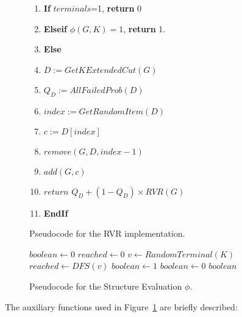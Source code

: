 \begin{figure}
\begin{algorithm}[H]
\caption{$RVR(G,K,p_v,p_e)$}
\begin{enumerate}
\item \textbf{If} $terminals$=1, \textbf{return} $0$
\item \textbf{Elseif} $\phi(G,K)=1$, \textbf{return} 1.
\item \textbf{Else} 
\item $D := GetKExtendedCut(G)$
\item $Q_{D} := AllFailedProb(D)$
\item $index := GetRandomItem(D)$
\item $c := D[index]$
\item $remove(G,D, index - 1)$
\item $add(G, c)$
\item $return \, \, Q_{D} + (1 - Q_{D})\times RVR(G)$
\item \textbf{EndIf}
\end{enumerate}
\end{algorithm}
\caption{Pseudocode for the RVR implementation. \label{rvr3}}
\end{figure}

\begin{figure}
\begin{algorithm}[H]
\caption{$boolean = \phi(G,K)$}
\begin{algorithmic}[1]
\STATE $boolean \leftarrow 0$
\ENDIF
\ENDFOR
\STATE $reached \leftarrow 0$
\STATE $v \leftarrow RandomTerminal(K)$
\STATE $reached \leftarrow DFS(v)$
\STATE $boolean \leftarrow 1$
\ELSE
\STATE $boolean \leftarrow 0$
\ENDIF
\RETURN $boolean$
\end{algorithmic}
\end{algorithm}
\caption{Pseudocode for the Structure Evaluation $\phi$. \label{fi}}
\end{figure}

The auxiliary functions used in Figure~\ref{rvr3} are briefly described:

